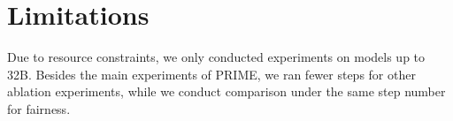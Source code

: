 % 






\newpage
\section{Limitations}
\label{sec:app_limitation}
Due to resource constraints, we only conducted experiments on models up to 32B. Besides the main experiments of PRIME, we ran fewer steps for other ablation experiments, while we conduct comparison under the same step number for fairness. 






